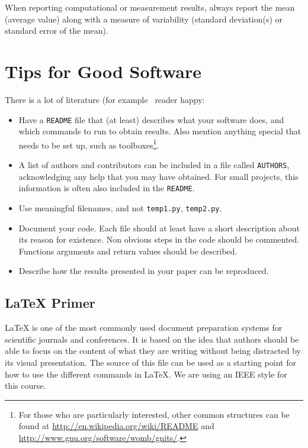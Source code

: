 \documentclass[10pt,conference,compsocconf]{IEEEtran}
\begin{document}
When reporting computational or measurement results, always
report the mean (average value) along with a measure of variability
(standard deviation(s) or standard error of the mean).


\section{Tips for Good Software}
\label{sec:tips-software}

There is a lot of literature (for example~
reader happy:
\begin{itemize}
\item Have a \texttt{README} file that (at least) describes what your
  software does, and which commands to run to obtain results. Also
  mention anything special that needs to be set up, such as
  toolboxes\footnote{For those who are
  particularly interested, other common structures can be found at
  \url{http://en.wikipedia.org/wiki/README} and
  \url{http://www.gnu.org/software/womb/gnits/}.}.
\item A list of authors and contributors can be included in a file
  called \texttt{AUTHORS}, acknowledging any help that you may have
  obtained. For small projects, this information is often also
  included in the \texttt{README}.
\item Use meaningful filenames, and not \texttt{temp1.py},
  \texttt{temp2.py}. 
\item Document your code. Each file should at least have a short
  description about its reason for existence. Non obvious steps in the
  code should be commented. Functions arguments and return values should be described.
\item Describe how the results presented in your paper can be reproduced.
\end{itemize}


\subsection{\LaTeX{} Primer}
\label{sec:latex-primer}

\LaTeX{} is one of the most commonly used document preparation systems
for scientific journals and conferences. It is based on the idea
that authors should be able to focus on the content of what they are
writing without being distracted by its visual presentation.
The source of this file can be used as a starting point for how to use
the different commands in \LaTeX{}. We are using an IEEE style for
this course.
\end{document}
